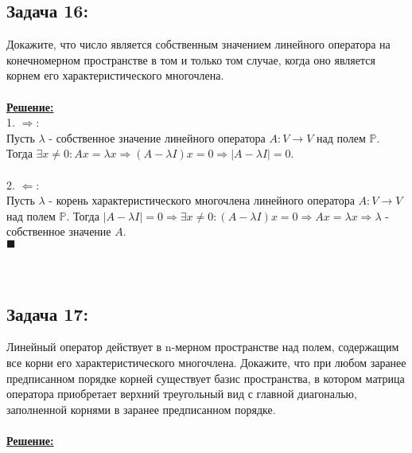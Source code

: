 \documentclass[a4paper,12pt,titlepage,final]{article}
\begin{document}
\subsection*{Задача 16:}
\noindent Докажите, что число является собственным значением линейного оператора на конечномерном
пространстве в том и только том случае, когда оно является корнем его характеристического
многочлена. \\ \\
\textbf{\underline{Решение:}} \\
1. $\Rightarrow:$ \\
Пусть $\lambda$ - собственное значение линейного оператора $A: V \rightarrow V$ над полем $\mathbb{P}$.
Тогда $\exists x \neq 0: Ax = \lambda x \Rightarrow (A - \lambda I)x = 0 \Rightarrow |A - \lambda I| = 0$. \\ \\
2. $\Leftarrow:$ \\
Пусть $\lambda$ - корень характеристического многочлена линейного оператора $A: V \rightarrow V$ над полем $\mathbb{P}$.
Тогда $|A - \lambda I| = 0 \Rightarrow \exists x \neq 0: (A - \lambda I)x = 0 \Rightarrow Ax = \lambda x
\Rightarrow \lambda$ - собственное значение $A$. \\ $\blacksquare$ \\ \\ \\


\subsection*{Задача 17:}
\noindent Линейный оператор действует в n-мерном пространстве над полем, содержащим все корни его
характеристического многочлена. Докажите, что при любом заранее предписанном порядке
корней существует базис пространства, в котором матрица оператора приобретает верхний
треугольный вид с главной диагональю, заполненной корнями в заранее предписанном порядке. \\ \\
\textbf{\underline{Решение:}} \\


\end{document}
